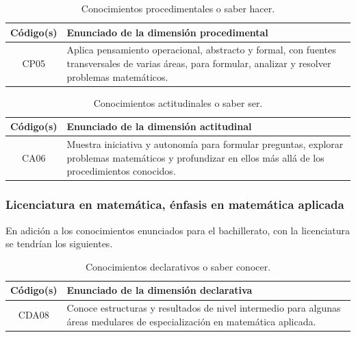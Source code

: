 
\begin{table}[H]
\centering
\renewcommand{\arraystretch}{1.3}
\begin{tabular}{|c|p{9cm}|}
\hline
\cellcolor[HTML]{00C0F3}\textbf{Código(s)}  & \cellcolor[HTML]{00C0F3}\textbf{Enunciado de la dimensión procedimental} \\
\hline
CP05 & Aplica pensamiento operacional, abstracto y formal, con fuentes transversales de varias áreas, para formular, analizar y resolver problemas matemáticos. \\
\hline
\end{tabular}
\caption{Conocimientos procedimentales o saber hacer.}
\label{tab:procedimental-egreso-integrada}
\end{table}


\begin{table}[H]
\centering
\renewcommand{\arraystretch}{1.3}
\begin{tabular}{|c|p{9cm}|}
\hline
\cellcolor[HTML]{00C0F3}\textbf{Código(s)} & \cellcolor[HTML]{00C0F3}\textbf{Enunciado de la dimensión actitudinal} \\
\hline
CA06 & Muestra iniciativa y autonomía para formular preguntas, explorar problemas matemáticos y profundizar en ellos más allá de los procedimientos conocidos.\\
\hline
\end{tabular}
\caption{Conocimientos actitudinales o saber ser.}
\label{tab:actitudinal-egreso-integrada}
\end{table}

\subsubsection{Licenciatura en matemática, énfasis en matemática aplicada}

En adición a los conocimientos enunciados para el bachillerato, con la licenciatura se tendrían los siguientes.

\begin{table}[H]
\centering
\renewcommand{\arraystretch}{1.3}
\begin{tabular}{|c|p{9cm}|}
\hline
\cellcolor[HTML]{00C0F3}\textbf{Código(s)} & \cellcolor[HTML]{00C0F3}\textbf{Enunciado de la dimensión declarativa} \\
\hline
CDA08 & Conoce estructuras y resultados de nivel intermedio para algunas áreas medulares de especialización en matemática aplicada. 
\\
\hline
\end{tabular}
\caption{Conocimientos declarativos o saber conocer.}
\label{tab:declarativa-egreso-integrada}
\end{table}

